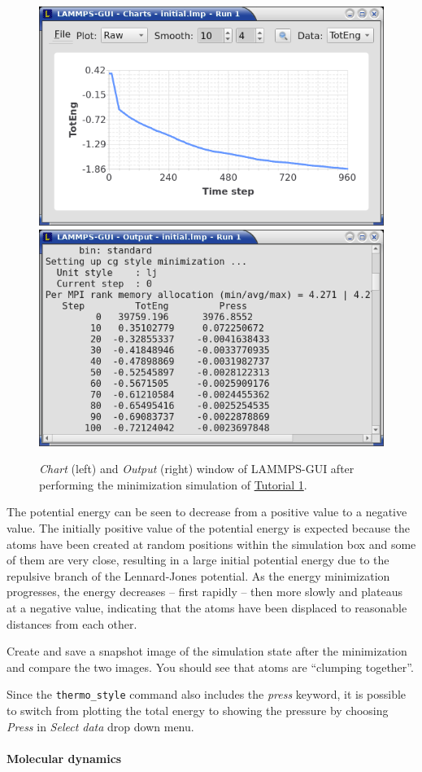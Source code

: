 \documentclass[9pt,tutorial]{livecoms}
\newcommand{\lmpcmd}[1]{\hspace{0pt}\colorbox{listing}{\textcolor{command}{\texttt{#1}}}\hspace{0pt}} %
\begin{document}
\begin{figure}
\centering
\includegraphics[width=0.49\linewidth]{chart-1}
\includegraphics[width=0.497\linewidth]{output-1}
\caption{\textit{Chart} (left) and \textit{Output} (right) window of LAMMPS-GUI after performing
  the minimization simulation of \hyperref[lennard-jones-label]{Tutorial 1}.}
\label{fig:chart-log}
\end{figure}

The potential energy can be seen to decrease from a positive value to a
negative value.  The initially positive value of the potential energy is
expected because the atoms have been created at random positions within
the simulation box and some of them are very close, resulting in a large
initial potential energy due to the repulsive branch of the
Lennard-Jones potential.  As the energy minimization progresses, the
energy decreases -- first rapidly -- then more slowly and plateaus at
a negative value, indicating that the atoms have been displaced to
reasonable distances from each other.

Create and save a snapshot image of the simulation state after the
minimization and compare the two images.  You should see that atoms
are ``clumping together''.

Since the \lmpcmd{thermo\_style} command also includes the \textit{press}
keyword, it is possible to switch from plotting the total energy to
showing the pressure by choosing \textit{Press} in \textit{Select data}
drop down menu.

\paragraph{Molecular dynamics}
\end{document}

